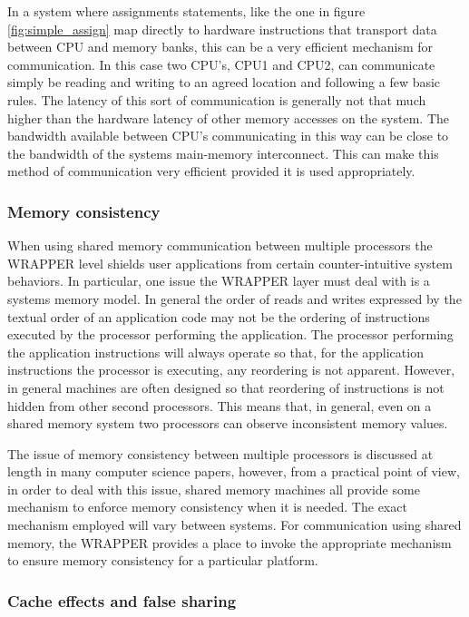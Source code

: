 In a system where assignments statements, like the one in figure 
\ref{fig:simple_assign} map directly to 
hardware instructions that transport data between CPU and memory banks, this 
can be a very efficient mechanism for communication. In this case two CPU's,
CPU1 and CPU2, can communicate simply be reading and writing to an 
agreed location and following a few basic rules. The latency of this sort
of communication is generally not that much higher than the hardware
latency of other memory accesses on the system. The bandwidth available
between CPU's communicating in this way can be close to the bandwidth of
the systems main-memory interconnect. This can make this method of 
communication very efficient provided it is used appropriately.

\subsubsection{Memory consistency}
\label{sec:memory_consistency}

When using shared memory communication between
multiple processors the WRAPPER level shields user applications from 
certain counter-intuitive system behaviors. In particular, one issue the 
WRAPPER layer must deal with is a systems memory model. In general the order 
of reads and writes expressed by the textual order of an application code may 
not be the ordering of instructions executed by the processor performing the 
application. The processor performing the application instructions will always
operate so that, for the application instructions the processor is executing, 
any reordering is not apparent. However, in general machines are often 
designed so that reordering of instructions is not hidden from other second 
processors.  This means that, in general, even on a shared memory system two 
processors can observe inconsistent memory values. 

The issue of memory consistency between multiple processors is discussed at 
length in many computer science papers, however, from a practical point of 
view, in order to deal with this issue, shared memory machines all provide 
some mechanism to enforce memory consistency when it is needed. The exact 
mechanism employed will vary between systems. For communication using shared 
memory, the WRAPPER provides a place to invoke the appropriate mechanism to 
ensure memory consistency for a particular platform.

\subsubsection{Cache effects and false sharing}
\label{sec:cache_effects_and_false_sharing}

